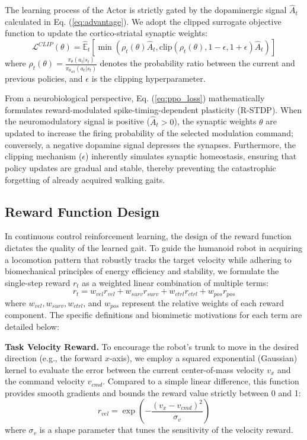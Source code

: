\documentclass[lettersize,journal]{IEEEtran}
\begin{document}
The learning process of the Actor is strictly gated by the dopaminergic signal $\hat{A}_t$ calculated in Eq. (\ref{eq:advantage}).
 We adopt the clipped surrogate objective function to update the cortico-striatal synaptic weights:
\begin{equation} \label{eq:ppo_loss}
    \mathcal{L}^{CLIP}(\theta) = \hat{\mathbb{E}}_t \left[ \min \left( \rho_t(\theta)\hat{A}_t, \text{clip}(\rho_t(\theta), 1-\epsilon, 1+\epsilon)\hat{A}_t \right) \right]
\end{equation}
where $\rho_t(\theta) = \frac{\pi_\theta(a_t|s_t)}{\pi_{\theta_{old}}(a_t|s_t)}$ denotes the probability ratio between the current and previous policies, and $\epsilon$ is the clipping hyperparameter. 

From a neurobiological perspective, Eq. (\ref{eq:ppo_loss}) mathematically formulates reward-modulated spike-timing-dependent plasticity (R-STDP). 
When the neuromodulatory signal is positive ($\hat{A}_t > 0$), the synaptic weights $\theta$ are updated to increase the firing probability of the selected modulation command; conversely, a negative dopamine signal depresses the synapses. 
Furthermore, the clipping mechanism ($\epsilon$) inherently simulates synaptic homeostasis, ensuring that policy updates are gradual and stable, thereby preventing the catastrophic forgetting of already acquired walking gaits.

\subsection{Reward Function Design}

In continuous control reinforcement learning, the design of the reward function dictates the quality of the learned gait. 
To guide the humanoid robot in acquiring a locomotion pattern that robustly tracks the target velocity while adhering to biomechanical principles of energy efficiency and stability, we formulate the single-step reward $r_t$ as a weighted linear combination of multiple terms:
\begin{equation}
    r_t = w_{vel} r_{vel} + w_{surv} r_{surv} + w_{ctrl} r_{ctrl} + w_{pos} r_{pos}
\end{equation}
where $w_{vel}, w_{surv}, w_{ctrl}$, and $w_{pos}$ represent the relative weights of each reward component. 
The specific definitions and biomimetic motivations for each term are detailed below:

\textbf{Task Velocity Reward.}
To encourage the robot's trunk to move in the desired direction (e.g., the forward $x$-axis), we employ a squared exponential (Gaussian) kernel to evaluate the error between the current center-of-mass velocity $v_x$ and the command velocity $v_{cmd}$. Compared to a simple linear difference, this function provides smooth gradients and bounds the reward value strictly between 0 and 1:
\begin{equation}
    r_{vel} = \exp \left( - \frac{(v_x - v_{cmd})^2}{\sigma_v} \right)
\end{equation}
where $\sigma_v$ is a shape parameter that tunes the sensitivity of the velocity reward.
\end{document}
